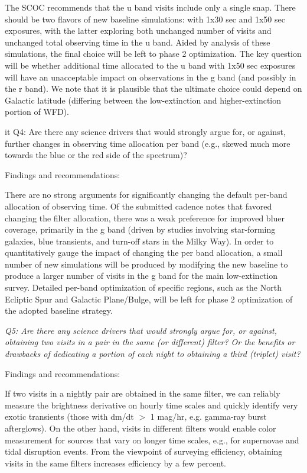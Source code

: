 The SCOC recommends that the u band visits include only a single snap. There should be two flavors of new baseline simulations: with 1x30 sec and 1x50 sec exposures, with the latter exploring both unchanged number of visits and unchanged total observing time in the u band. Aided by analysis of these simulations, the final choice will be left to phase 2 optimization. The key question will be whether additional time allocated to the u band with 1x50 sec exposures will have an unacceptable impact on observations in the g band (and possibly in the r band). We note that it is plausible that the ultimate choice could depend on Galactic latitude (differing between the low-extinction and higher-extinction portion of WFD).


{it Q4:  Are there any science drivers that would strongly argue for, or against, further changes in observing time allocation per band (e.g., skewed much more towards the blue or the red side of the spectrum)? }

Findings and recommendations:

There are no strong arguments for significantly changing the default per-band allocation of observing time. Of the submitted cadence notes that favored changing the filter allocation, there was a weak preference for improved bluer coverage, primarily in the g band (driven by studies involving star-forming galaxies, blue transients, and turn-off stars in the Milky Way). In order to quantitatively gauge the impact of changing the per band allocation, a small number of new simulations will be produced by modifying the new baseline to produce a larger number of visits in the g band for the main low-extinction survey. Detailed per-band optimization of specific regions, such as the North Ecliptic Spur and Galactic Plane/Bulge, will be left for phase 2 optimization of the adopted baseline strategy. 


{\it Q5:  Are there any science drivers that would strongly argue for, or against, obtaining two visits in a pair in the same (or different) filter? Or the benefits or drawbacks of dedicating  a portion of each night to obtaining a third (triplet) visit?   }

Findings and recommendations:

If two visits in a nightly pair are obtained in the same filter, we can reliably measure the brightness derivative on hourly time scales and quickly identify very exotic transients (those with dm/dt $>$ 1 mag/hr, e.g. gamma-ray burst afterglows). On the other hand, visits in different filters would enable color measurement for sources that vary on longer time scales, e.g., for supernovae and tidal disruption events. From the viewpoint of surveying efficiency, obtaining visits in the same filters increases efficiency by a few percent.

